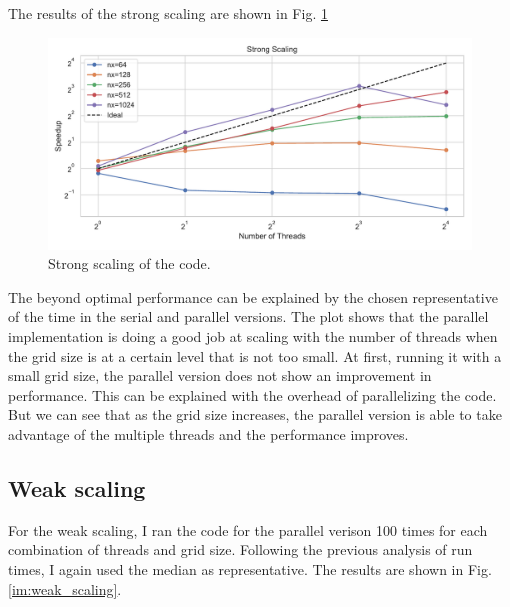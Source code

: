 \documentclass[unicode,11pt,a4paper,oneside,numbers=endperiod,openany]{scrartcl}
\begin{document}
The results of the strong scaling are shown in Fig. \ref{im:strong_scaling}
\begin{figure}[!h]
    \centering
    \includegraphics[width=\textwidth]{../mini_app/strong_scaling_plot.pdf}
    \caption{Strong scaling of the code.}
    \label{im:strong_scaling}
\end{figure}
The beyond optimal performance can be explained by the chosen representative of
the time in the serial and parallel versions. The plot shows that the parallel
implementation is doing a good job at scaling with the number of threads when
the grid size is at a certain level that is not too small.
At first, running it with a small grid size, the parallel version does not show
an improvement in performance. This can be explained with the overhead of
parallelizing the  code. But we can see that as the grid size increases, the
parallel version is able to take advantage of the multiple threads and the
performance improves.

\subsection*{Weak scaling}
For the weak scaling, I ran the code for the parallel verison 100 times for each
combination of threads and grid size. 
Following the previous analysis of run times, I again
used the median as representative. 
The results are shown in Fig. \ref{im:weak_scaling}.
\end{document}
